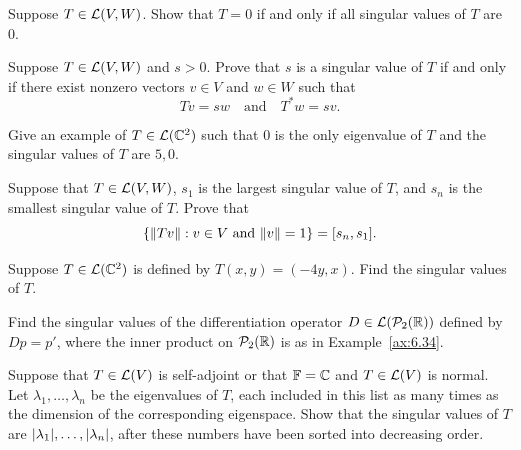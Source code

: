 \begin{exc}

\begin{exercise}
Suppose $T\in\mathcal{L}(V,W)$. Show that $T=0$ if and only if all singular values of
$T$ are $0$.
\end{exercise}

\begin{exercise}
Suppose $T\in\mathcal{L}(V,W)$ and $s>0$. Prove that $s$ is a singular value of $T$ if
and only if there exist nonzero vectors $v\in V$ and $w\in W$ such that
\[ Tv=sw \quad\text{and}\quad T^*w=sv. \]
\end{exercise}

\begin{exercise}
Give an example of $T\in\mathcal{L}(\mathbb{C}^2)$ such that $0$ is the only eigenvalue of $T$
and the singular values of $T$ are $5,0$.
\end{exercise}

\begin{exercise}
Suppose that $T\in\mathcal{L}(V,W)$, $s_1$ is the largest singular value of $T$, and
$s_n$ is the smallest singular value of $T$. Prove that
\[ \{\lVert Tv \rVert : v\in V \text{ and } \lVert v \rVert=1\} = [s_n,s_1]. \]
\end{exercise}

\begin{exercise}
Suppose $T\in\mathcal{L}(\mathbb{C}^2)$ is defined by $T(x,y)=(-4y,x)$. Find the singular
values of $T$.
\end{exercise}

\begin{exercise}
Find the singular values of the differentiation operator
$D\in\mathcal{L}(\mathcal{P}_2(\mathbb{R}))$ defined by $Dp=p'$, where the inner product on
$\mathcal{P}_2(\mathbb{R})$ is as in Example~\ref{ax:6.34}.
\end{exercise}

\begin{exercise}
Suppose that $T\in\mathcal{L}(V)$ is self-adjoint or that $\mathbb{F}=\mathbb{C}$ and $T\in\mathcal{L}(V)$ is
normal. Let $\lambda_1,\dots,\lambda_n$ be the eigenvalues of $T$, each
included in this list as many times as the dimension of the corresponding
eigenspace. Show that the singular values of $T$ are
$\lvert \lambda_1 \rvert,\dots,\lvert \lambda_n \rvert$, after these numbers have been sorted
into decreasing order.
\end{exercise}


\end{exc}
